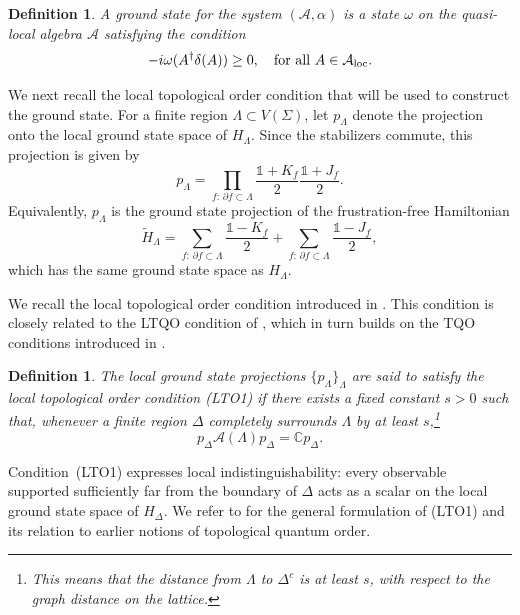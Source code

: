 \documentclass[a4paper,11pt]{article}
\newtheorem{definition}[theorem]{Definition}
\theoremstyle{definition}
\theoremstyle{remark}
\theoremstyle{remark}
\begin{document}
\begin{definition} \label{def:groud_state}
    A ground state for the system $(\mathcal{A},\alpha)$ is a state $\omega$ on the quasi-local algebra $\mathcal{A}$ satisfying the condition 
    \begin{equation*}
        -i\omega(A^\dagger\delta(A))\geq 0,\quad \text{for~all}~A\in \mathcal{A}_{\rm loc}. 
    \end{equation*}
\end{definition}


We next recall the local topological order condition that will be used to construct the ground state. For a finite region $\Lambda\subset V(\Sigma)$, let $p_\Lambda$ denote the projection onto the local ground state space of $H_\Lambda$. Since the stabilizers commute, this projection is given by
\[
    p_\Lambda = \prod_{f:\,\partial f\subset\Lambda}
    \frac{\mathds{1}+K_f}{2}
    \frac{\mathds{1}+J_f}{2}.
\]
Equivalently, $p_\Lambda$ is the ground state projection of the frustration-free Hamiltonian
\begin{equation} \label{eq:Hamiltonian-1}
    \widetilde H_\Lambda = \sum_{f:\,\partial f\subset\Lambda} \frac{\mathds{1}-K_f}{2} + \sum_{f:\,\partial f\subset\Lambda} \frac{\mathds{1}-J_f}{2},
\end{equation}
which has the same ground state space as $H_\Lambda$.


We recall the local topological order condition introduced in \cite{jones2025local}. This condition is closely related to the LTQO condition of \cite{Michalakis2013stability}, which in turn builds on the TQO conditions introduced in \cite{Bravyi2010topological}.

\begin{definition}
    The local ground state projections $\{p_\Lambda\}_\Lambda$ are said to satisfy the local topological order condition {\rm (LTO1)} if there exists a fixed constant $s>0$ such that, whenever a finite region $\Delta$ completely surrounds $\Lambda$ by at least $s$,\footnote{This means that the distance from $\Lambda$ to $\Delta^c$ is at least $s$, with respect to the graph distance on the lattice.}
    \begin{equation}
        p_\Delta \mathcal A(\Lambda) p_\Delta
        =
        \mathbb C p_\Delta.
    \end{equation}
\end{definition}

Condition~{\rm (LTO1)} expresses local indistinguishability: every observable supported sufficiently far from the boundary of $\Delta$ acts as a scalar on the local ground state space of $H_\Delta$. We refer to \cite{jones2025local} for the general formulation of {\rm (LTO1)} and its relation to earlier notions of topological quantum order.
\end{document}
